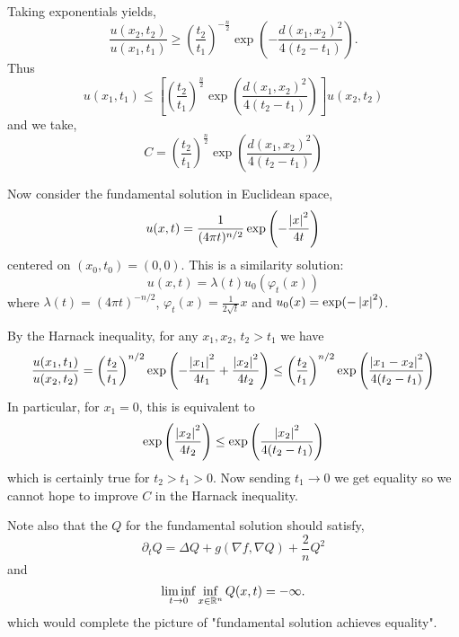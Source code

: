 \documentclass{amsart}
\begin{document}
Taking exponentials yields,
\[
\frac{u(x_2, t_2)}{u(x_1, t_1)} \geq \left(\frac{t_2}{t_1}\right)^{-\tfrac{n}{2}} \exp\left(- \frac{d(x_1, x_2)^2}{4(t_2 - t_1)}\right).
\]
Thus
\[
u(x_1, t_1) \leq \left[\left(\frac{t_2}{t_1}\right)^{\tfrac{n}{2}} \exp\left(\frac{d(x_1, x_2)^2}{4(t_2 - t_1)}\right)\right] u(x_2, t_2)
\]
and we take,
\[
C = \left(\frac{t_2}{t_1}\right)^{\tfrac{n}{2}} \exp\left(\frac{d(x_1, x_2)^2}{4(t_2 - t_1)}\right)
\]

Now consider the fundamental solution in Euclidean space,
\[
u(x, t) = \frac{1}{(4\pi t)^{n/2}} \exp\left(-\frac{\left|{x}\right|^2}{4t}\right)
\]
centered on $(x_0, t_0) = (0, 0)$. This is a similarity solution:
\[
u(x, t) = \lambda(t) u_0(\varphi_t(x))
\]
where $\lambda(t) = (4\pi t)^{-n/2}$, $\varphi_t(x) = \tfrac{1}{2\sqrt{t}} x$ and $u_0(x) = \exp(-\left|{x}\right|^2)$.

By the Harnack inequality, for any $x_1, x_2$, $t_2 > t_1$ we have
\[
\frac{u(x_1, t_1)}{u(x_2, t_2)} = \left(\frac{t_2}{t_1}\right)^{n/2} \exp\left(-\frac{\left|{x_1}\right|^2}{4t_1} + \frac{\left|{x_2}\right|^2}{4t_2}\right) \leq \left(\frac{t_2}{t_1}\right)^{n/2} \exp\left(\frac{\left|{x_1 - x_2}\right|^2}{4(t_2 - t_1)}\right)
\]
In particular, for $x_1 = 0$, this is equivalent to
\[
\exp\left(\frac{\left|{x_2}\right|^2}{4t_2}\right) \leq \exp\left(\frac{\left|{x_2}\right|^2}{4(t_2 - t_1)}\right)
\]
which is certainly true for $t_2 > t_1 > 0$. Now sending $t_1 \to 0$ we get equality so we cannot hope to improve $C$ in the Harnack inequality.

Note also that the $Q$ for the fundamental solution should satisfy,
\[
\partial_t Q = \Delta Q + g(\nabla f, \nabla Q) + \frac{2}{n} Q^2
\]
and
\[
\liminf_{t\to 0} \inf_{x \in \mathbb{R}^n} Q(x, t) = - \infty.
\]
which would complete the picture of "fundamental solution achieves equality".
\end{document}
